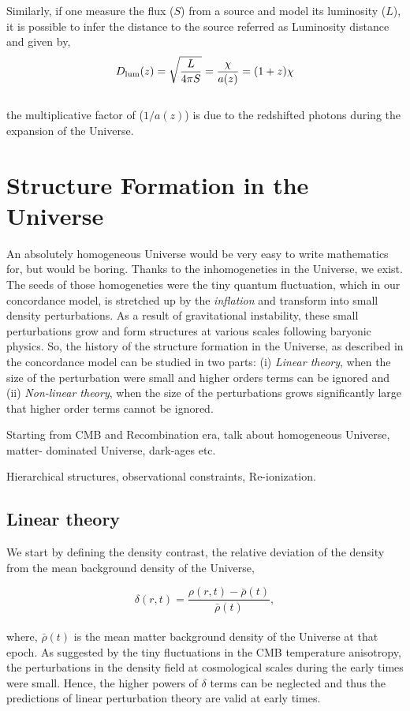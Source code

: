 Similarly, if one measure the flux ($S$) from a source and model its luminosity ($L$), it is
possible to infer the distance to the source referred as Luminosity distance and 
given by,
\begin{equation}
	D_{\rm lum}(z) = \sqrt{\dfrac{L}{4\pi S}} = \dfrac{\chi}{a(z)} = (1+z)\chi
\end{equation}
\\
the multiplicative factor of ($1/a(z)$) is due to the redshifted photons during the
expansion of the Universe.


\clearpage
\section{Structure Formation in the Universe}

An absolutely homogeneous Universe would be very easy to write mathematics for, but 
would be boring. Thanks to the inhomogeneties in the Universe, we exist. The seeds
of those homogeneties were the tiny quantum fluctuation, which in our concordance 
model, is stretched up by the {\it inflation} and transform into small density
perturbations. As a result of gravitational instability, these small perturbations 
grow and form structures at various scales following baryonic physics. 
So, the history of the  structure formation in the Universe, as described in the 
concordance model can be studied in two parts: (i) {\it Linear theory}, when
the size of the perturbation were small and higher orders terms can be ignored and 
(ii) {\it Non-linear theory}, when the size of the perturbations grows significantly
large that higher order terms cannot be ignored.

Starting from CMB and Recombination era, talk about homogeneous Universe, matter-
dominated Universe, dark-ages etc.

Hierarchical structures, observational constraints, Re-ionization.

\subsection{Linear theory}


We start by defining the density contrast, the relative deviation of the density
from the mean background density of the Universe,

\begin{equation}
	\delta(r,t) = \dfrac{\rho(r,t) - \bar{\rho}(t)}{\bar{\rho}(t)},
\end{equation}
\\
where, $\bar{\rho}(t)$ is the mean matter background density 
of the Universe at that epoch. 
As suggested by the tiny fluctuations in the CMB temperature anisotropy, 
the perturbations in the density field at cosmological scales during 
the early times were small. Hence, the higher powers of $\delta$ terms
can be neglected and thus the predictions of linear perturbation theory
are valid at early times.

